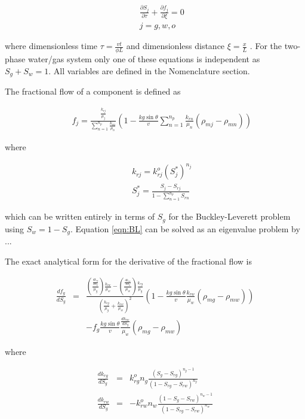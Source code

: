 \begin{eqnarray}
&&\frac{{\partial S_j }}{{\partial \tau }} +  \frac{{\partial f_j }}{{\partial \xi }}  = 0 \label{eqn:BL}\\
&&j = g,w,o \nonumber
\end{eqnarray}

\noindent where dimensionless time $\tau = \frac{v t}{\phi L}$ and dimensionless distance $\xi = \frac{x}{L}$ .  For the two-phase water/gas system only one of these equations is independent as $S_g + S_w = 1$.  All variables are defined in the Nomenclature section.

The fractional flow of a component is defined as

\begin{eqnarray}
&&f_j = \frac{\frac{k_{rj}}{\mu_j}}{\sum_{n=1}^{n_p}{\frac{k_{rn}}{\mu_n}}} \left( 1-\frac{kg \sin \theta}{v} \sum_{n=1}^{n_p}{\frac{k_{rn}}{\mu_n}\left( \rho_{mj}-\rho_{mn} \right)} \right) \label{eqn:ff}
\end{eqnarray}

\noindent where

\begin{eqnarray}
&&k_{rj} = k_{rj}^o {\left(S_j^*\right)^{n_j}}\\
&&S_j^* = \frac{S_j - S_{rj}}{1-\sum_{n=1}^{n_p}{S_{rn}}} \nonumber
\end{eqnarray}

\noindent which can be written entirely in terms of $S_g$ for the Buckley-Leverett problem using $S_w = 1-S_g$.  Equation \ref{eqn:BL} can be solved as an eigenvalue problem by ...

The exact analytical form for the derivative of the fractional flow is

\begin{eqnarray}
\frac{df_g}{dS_g}&=& \frac{\left(\frac{\frac{d k_{rg}}{d S_g}}{\mu_g}\right) \frac{k_{rw}}{\mu_w}-\left(\frac{\frac{d k_{rw}}{d S_g}}{\mu_w}\right)\frac{k_{rg}}{\mu_g}}{\left(\frac{k_{rg}}{\mu_g}+\frac{k_{rw}}{\mu_w}\right)^2}\left( 1-\frac{kg \sin \theta}{v} \frac{k_{rw}}{\mu_w}\left( \rho_{mg}-\rho_{mw} \right) \right)\nonumber \\
&&-f_g\frac{kg \sin \theta}{v} \frac{\frac{d k_{rw}}{d S_g}}{\mu_w}\left(\rho_{mg}-\rho_{mw} \right)
\end{eqnarray}

\noindent where

\begin{eqnarray}
\frac{d k_{rg}}{d S_g} &=& k_{rg}^o n_g \frac{\left(S_g - S_{rg}\right)^{n_g-1}}{\left(1-S_{rg}-S_{rw}\right)^{n_g}}\nonumber \\
\frac{d k_{rw}}{d S_g}&=& -k_{rw}^o n_w \frac{\left(1-S_g - S_{rw}\right)^{n_w-1}}{\left(1-S_{rg}-S_{rw}\right)^{n_w}}\nonumber 
\end{eqnarray}



